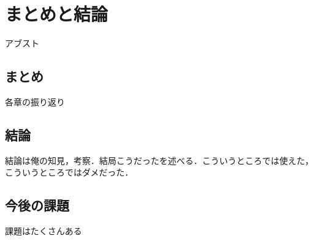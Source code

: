 \chapter{まとめと結論}
\label{chap:conclusion}

アブスト

\section{まとめ}

各章の振り返り

\section{結論}

結論は俺の知見，考察．結局こうだったを述べる．こういうところでは使えた，こういうところではダメだった．

\section{今後の課題}

課題はたくさんある
